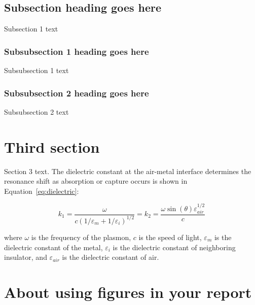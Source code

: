 \subsection{Subsection heading goes here}

Subsection 1 text

\subsubsection{Subsubsection 1 heading goes here}
Subsubsection 1 text

\subsubsection{Subsubsection 2 heading goes here}
Subsubsection 2 text

\section{Third section}
Section 3 text. The dielectric constant
at the air-metal interface determines
the resonance shift as absorption or capture occurs
is shown in Equation~\eqref{eq:dielectric}:

\begin{equation}\label{eq:dielectric}
k_1=\frac{\omega}{c({1/\varepsilon_m + 1/\varepsilon_i})^{1/2}}=k_2=\frac{\omega
\sin(\theta)\varepsilon_\mathit{air}^{1/2}}{c}
\end{equation}

\noindent
where $\omega$ is the frequency of the plasmon, $c$ is the speed of
light, $\varepsilon_m$ is the dielectric constant of the metal,
$\varepsilon_i$ is the dielectric constant of neighboring insulator,
and $\varepsilon_\mathit{air}$ is the dielectric constant of air.

\section{About using figures in your report}

\newcommand{\loremipsum}{
  \textit{Lorem ipsum dolor sit amet, consectetur adipisicing elit, sed do
  eiusmod tempor incididunt ut labore et dolore magna aliqua. Ut enim ad
  minim veniam, quis nostrud exercitation ullamco laboris nisi ut
  aliquip ex ea commodo consequat. Duis aute irure dolor in
  reprehenderit in voluptate velit esse cillum dolore eu fugiat nulla
  pariatur. Excepteur sint occaecat cupidatat non proident, sunt in
  culpa qui officia deserunt mollit anim id est laborum.}\par}

